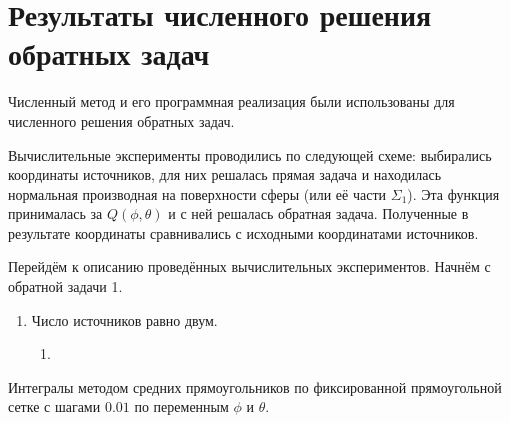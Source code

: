 \section{Результаты численного решения обратных задач}

Численный метод и его программная реализация были использованы для численного решения обратных задач.

Вычислительные эксперименты проводились по следующей схеме: выбирались координаты источников, для них решалась прямая задача и находилась нормальная производная на поверхности сферы (или её части $\Sigma_1$). Эта функция принималась за $Q(\phi, \theta)$ и с ней решалась обратная задача. Полученные в результате координаты сравнивались с исходными координатами источников.

Перейдём к описанию проведённых вычислительных экспериментов. Начнём с обратной задачи 1.

\begin{enumerate}
	\item Число источников равно двум.
	
	\begin{enumerate}
		\item 
	\end{enumerate}
\end{enumerate}

Интегралы  методом средних прямоугольников по фиксированной прямоугольной сетке с шагами $0.01$ по переменным $\phi$ и $\theta$.

